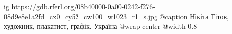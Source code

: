  
 
 
 
 

\ifcmt
  ig https://gdb.rferl.org/08b40000-0a00-0242-f276-08d9e8e1a2fd_cx0_cy52_cw100_w1023_r1_s.jpg
  @caption Нікіта Тітов, художник, плакатист, графік. Україна
  @wrap center
  @width 0.8
\fi
